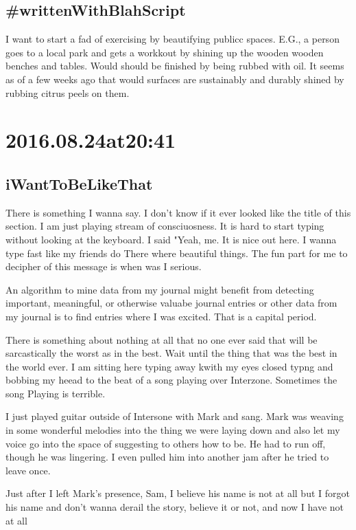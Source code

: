 \begin{enumerate}
\begin{enumerate}
\subsection*{ #writtenWithBlahScript }
I want to start a fad of exercising by beautifying publicc spaces. E.G., a person goes to a local park and gets a workkout by shining up the wooden wooden benches and tables. Would should be finished by being rubbed with oil. It seems as of a few weeks ago that  would surfaces are sustainably and durably shined by rubbing citrus peels on them.

\section*{ 2016.08.24at20:41 }
\subsection*{iWantToBeLikeThat}
There is something I wanna say. I don't know if it ever looked like the title of this section. I am just playing stream of consciuosness. It is hard to start typing without looking at the keyboard. I said "Yeah, me. It is nice out here. I wanna type fast like my friends do There where beautiful things. The fun part for me to decipher of this message is when was I serious.

An algorithm to mine data from my journal might benefit from detecting important, meaningful, or otherwise valuabe journal entries or other data from my journal is to find entries where I was excited. That is a capital period.

There is something about nothing at all that no one ever said that will be sarcastically the worst as in the best. Wait until the thing that was the best in the world ever. I am sitting here typing away kwith my eyes closed typng and bobbing my heead to the beat of a song playing over Interzone. Sometimes the song Playing is terrible.

I just played guitar outside of Intersone with Mark and sang. Mark was weaving in some wonderful melodies into the thing we were laying down and also let my voice go into the space of suggesting to others how to be. He had to run off, though he was lingering. I even pulled him into another jam after he tried to leave once.

Just after I left Mark's presence, Sam, I believe his name is not at all but I forgot his name and don't wanna derail the story, believe it or not, and now I have not at all 


\end{enumerate}
\end{enumerate}
